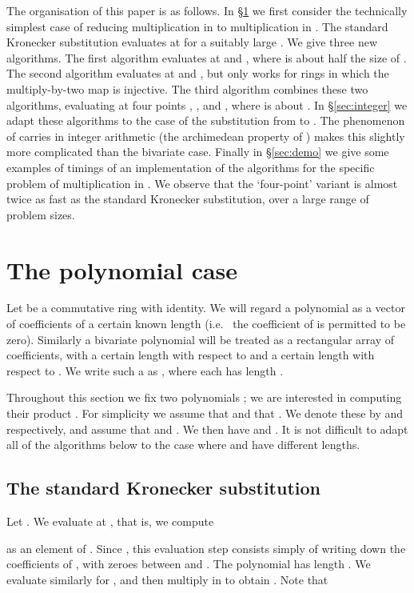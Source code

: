 \documentclass{amsart}
\theoremstyle{definition}
\theoremstyle{remark}
\begin{document}
The organisation of this paper is as follows. In \S\ref{sec:polynomial} we first consider the technically simplest case of reducing multiplication in  to multiplication in . The standard Kronecker substitution evaluates at  for a suitably large . We give three new algorithms. The first algorithm evaluates at  and , where  is about half the size of . The second algorithm evaluates at  and , but only works for rings in which the multiply-by-two map is injective. The third algorithm combines these two algorithms, evaluating at four points , ,  and , where  is about . In \S\ref{sec:integer} we adapt these algorithms to the case of the substitution from  to . The phenomenon of carries in integer arithmetic (the archimedean property of ) makes this slightly more complicated than the bivariate case. Finally in \S\ref{sec:demo} we give some examples of timings of an implementation of the algorithms for the specific problem of multiplication in . We observe that the `four-point' variant is almost twice as fast as the standard Kronecker substitution, over a large range of problem sizes.


\section{The polynomial case}
\label{sec:polynomial}

Let  be a commutative ring with identity. We will regard a polynomial  as a vector of coefficients of a certain known length  (i.e.~ the coefficient of  is permitted to be zero). Similarly a bivariate polynomial  will be treated as a rectangular array of coefficients, with a certain length  with respect to  and a certain length  with respect to . We write such a  as , where each  has length .

Throughout this section we fix two polynomials ; we are interested in computing their product . For simplicity we assume that  and that . We denote these by  and  respectively, and assume that  and . We then have  and . It is not difficult to adapt all of the algorithms below to the case where  and  have different lengths.


\subsection{The standard Kronecker substitution}
\label{sec:polynomial-std}

Let . We evaluate at , that is, we compute
 
as an element of . Since , this evaluation step consists simply of writing down the coefficients of , with  zeroes between  and . The polynomial  has length . We evaluate similarly for , and then multiply in  to obtain . Note that
 
\end{document}
